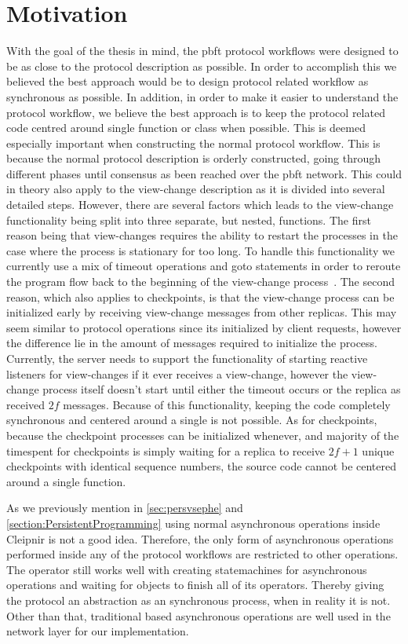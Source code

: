 \section{Motivation}
With the goal of the thesis in mind, the \ac{pbft} protocol workflows were designed to be as close to the protocol description as possible. In order to accomplish this we believed the best approach would be to design protocol related workflow as synchronous as possible. In addition, in order to make it easier to understand the protocol workflow, we believe the best approach is to keep the protocol related code centred around single function or class when possible. This is deemed especially important when constructing the normal protocol workflow. This is because the normal protocol description is orderly constructed, going through different phases until consensus as been reached over the \ac{pbft} network. This could in theory also apply to the view-change description as it is divided into several detailed steps. However, there are several factors which leads to the view-change functionality being split into three separate, but nested, functions. The first reason being that view-changes requires the ability to restart the processes in the case where the process is stationary for too long. To handle this functionality we currently use a mix of timeout operations and goto statements in order to reroute the program flow back to the beginning of the view-change process~\cite{WEB:goto}. The second reason, which also applies to checkpoints, is that the view-change process can be initialized early by receiving view-change messages from other replicas. This may seem similar to protocol operations since its initialized by client requests, however the difference lie in the amount of messages required to initialize the process. Currently, the server needs to support the functionality of starting reactive listeners for view-changes if it ever receives a view-change, however the view-change process itself doesn't start until either the timeout occurs or the replica as received $2f$ messages. Because of this functionality, keeping the code completely synchronous and centered around a single is not possible. As for checkpoints, because the checkpoint processes can be initialized whenever, and majority of the timespent for checkpoints is simply waiting for a replica to receive $2f+1$ unique checkpoints with identical sequence numbers, the source code cannot be centered around a single function.

As we previously mention in \autoref{sec:persvsephe} and \autoref{section:PersistentProgramming} using normal asynchronous operations inside Cleipnir is not a good idea. Therefore, the only form of asynchronous operations performed inside any of the protocol workflows are restricted to other  operations. The  operator still works well with creating statemachines for asynchronous  operations and waiting for  objects to finish all of its operators. Thereby giving the protocol an abstraction as an synchronous process, when in reality it is not. Other than that, traditional  based asynchronous operations are well used in the network layer for our implementation. 

